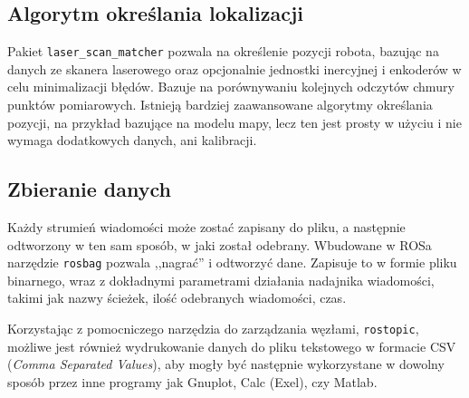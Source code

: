 	\subsection{Algorytm określania lokalizacji}
		Pakiet \texttt{laser\_scan\_matcher} pozwala na określenie pozycji robota, bazując na danych ze skanera laserowego oraz opcjonalnie jednostki inercyjnej i enkoderów w
		celu minimalizacji błędów. Bazuje na porównywaniu kolejnych odczytów chmury punktów pomiarowych.
		Istnieją bardziej zaawansowane algorytmy określania pozycji, na przykład bazujące na modelu mapy, lecz ten jest prosty w użyciu i nie wymaga dodatkowych danych, ani kalibracji.
		
	\subsection{Zbieranie danych}
		Każdy strumień wiadomości może zostać zapisany do pliku, a następnie odtworzony w ten sam sposób, w jaki został odebrany.
		Wbudowane w ROSa narzędzie \texttt{rosbag} pozwala ,,nagrać'' i odtworzyć dane.
		Zapisuje to w formie pliku binarnego, wraz z dokładnymi parametrami działania nadajnika wiadomości, takimi jak nazwy ścieżek, ilość odebranych wiadomości, czas.
		
		Korzystając z pomocniczego narzędzia do zarządzania węzłami, \texttt{rostopic},
		możliwe jest również wydrukowanie danych do pliku tekstowego w formacie CSV (\emph{Comma Separated Values}),
		aby mogły być następnie wykorzystane w dowolny sposób przez inne programy jak Gnuplot, Calc (Exel), czy Matlab.
		
	
	
	
	
	

